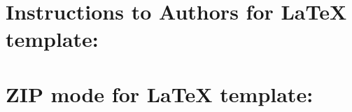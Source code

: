 \documentclass[5p,times,procedia]{elsarticle}
\begin{document}















\clearpage\onecolumn

\normalMode

\section*{Instructions to Authors for LaTeX template:}

\section{ZIP mode for LaTeX template:}
\end{document}
